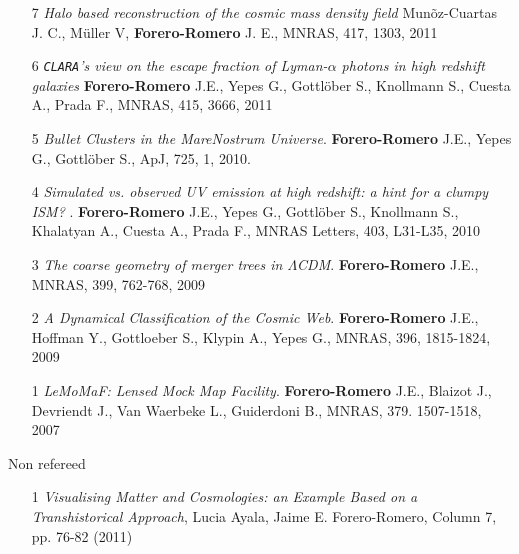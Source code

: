 \documentclass[9pt]{article}
\begin{document}
\begin{enumerate}
\item[7] 
{\it Halo based reconstruction of the cosmic mass density field}
Mun\~oz-Cuartas J. C., M\"uller V, {\bf Forero-Romero} J. E.,
MNRAS, 417, 1303, 2011

\item [6]
{\it {\tt CLARA}'s view on the escape fraction of Lyman-$\alpha$ photons in
  high redshift galaxies}
{\bf Forero-Romero} J.E., Yepes G., Gottl\"ober S., Knollmann S., Cuesta A., Prada F.,  
MNRAS, 415, 3666, 2011

\item [5]
{\it Bullet Clusters in the MareNostrum Universe}. 
{\bf Forero-Romero} J.E., Yepes G., Gottl\"ober S., 
ApJ, 725, 1, 2010.

\item [4]
{\it Simulated vs. observed UV emission at high redshift: a hint for a clumpy
ISM? }. 
{\bf Forero-Romero} J.E., Yepes G., Gottl\"ober S., Knollmann S., Khalatyan A., Cuesta A., Prada F.,   MNRAS Letters, 403,  L31-L35, 2010

\item [3]
{\it The coarse geometry of merger trees in
  $\Lambda$CDM}.  {\bf Forero-Romero} J.E., 
MNRAS, 399, 762-768, 2009

\item [2]
{\it A Dynamical Classification of the  Cosmic Web}.  {\bf Forero-Romero} J.E., Hoffman Y.,  Gottloeber S., Klypin A., Yepes G.,
MNRAS, 396, 1815-1824, 2009

\item [1] 
{\it {\sc LeMoMaF}:  Lensed Mock Map Facility}. 
{\bf Forero-Romero} J.E., Blaizot J., Devriendt J., Van Waerbeke L., Guiderdoni B., 
MNRAS, 379. 1507-1518, 2007
\end{enumerate}




Non refereed 
\begin{enumerate}
\item[1] {\it Visualising Matter and Cosmologies: an Example Based on
  a Transhistorical Approach}, Lucia Ayala, Jaime E. Forero-Romero,
  Column 7, pp. 76-82 (2011) 
\end{enumerate}
\end{document}
